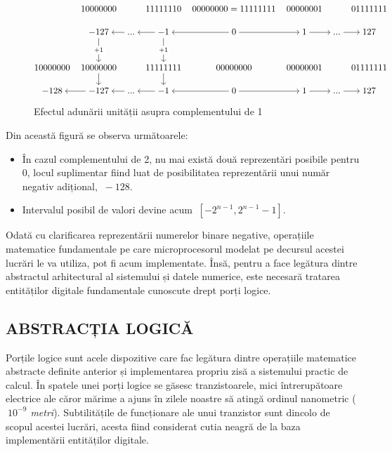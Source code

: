 \documentclass[12pt]{article}
\begin{document}
 \begin{figure}[h!]
 \[\begin{tikzcd}[cramped,column sep=tiny,row sep=scriptsize]
	& 10000000 && 11111110 & {00000000 = 11111111} & 00000001 && 01111111 \\
	& {-127} & {...} & {-1} & 0 & 1 & {...} & 127 \\
	\\
	10000000 & 10000000 && 11111111 & 00000000 & 00000001 && 01111111 \\
	{-128} & {-127} & {...} & {-1} & 0 & 1 & {...} & 127
	\arrow["{+1}"{description}, from=2-2, to=4-2]
	\arrow[from=2-3, to=2-2]
	\arrow[from=2-4, to=2-3]
	\arrow["{+1}"{description}, from=2-4, to=4-4]
	\arrow[from=2-5, to=2-4]
	\arrow[from=2-5, to=2-6]
	\arrow[from=2-6, to=2-7]
	\arrow[from=2-7, to=2-8]
	\arrow[from=4-2, to=5-2]
	\arrow[from=4-4, to=5-4]
	\arrow[from=5-2, to=5-1]
	\arrow[from=5-3, to=5-2]
	\arrow[from=5-4, to=5-3]
	\arrow[from=5-5, to=5-4]
	\arrow[from=5-5, to=5-6]
	\arrow[from=5-6, to=5-7]
	\arrow[from=5-7, to=5-8]
\end{tikzcd}\]
 \centering
 \caption{Efectul adunării unității asupra complementului de 1}
 \label{Figura:3}
\end{figure}

\newpage
Din această figură se observa următoarele:
\begin{itemize}
\item În cazul complementului de 2, nu mai există două reprezentări posibile pentru 0, locul suplimentar fiind luat de posibilitatea reprezentării unui număr negativ adițional, $\ -128$.
\item Intervalul posibil de valori devine acum  $\ [-2^{n-1}, 2^{n-1}-1]$.
\end{itemize}

Odată cu clarificarea reprezentării numerelor binare negative, operațiile matematice fundamentale pe care microprocesorul modelat pe decursul acestei lucrări le va utiliza, pot fi acum implementate. Însă, pentru a face legătura dintre abstractul arhitectural al sistemului și datele numerice, este necesară tratarea entităților digitale fundamentale cunoscute drept porți logice. 

\subsection{ABSTRACȚIA LOGICĂ} 

Porțile logice sunt acele dispozitive care fac legătura dintre operațiile matematice abstracte definite anterior și implementarea propriu zisă a sistemului practic de calcul. În spatele unei porți logice se găsesc tranzistoarele, mici întrerupătoare electrice ale căror mărime a ajuns în zilele noastre să atingă ordinul nanometric (\textit{$\ 10^{-9}$ metri}). Subtilitățile de  funcționare ale unui tranzistor sunt dincolo de scopul acestei lucrări, acesta fiind considerat cutia neagră de la baza implementării entităților digitale.
\end{document}
